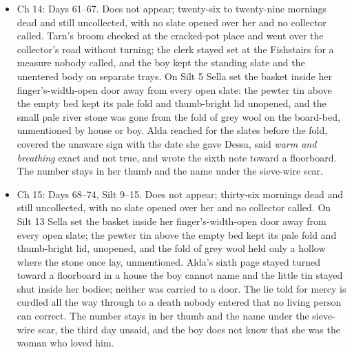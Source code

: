 \documentclass{design/chronicle}
\begin{document}
{\begin{itemize}[leftmargin=1.4em,itemsep=1pt,topsep=3pt,parsep=0pt]
\end{itemize}

\begin{itemize}[leftmargin=1.4em,itemsep=1pt,topsep=3pt,parsep=0pt]

\item Ch 14: Days 61–67. Does not appear; twenty-six to twenty-nine mornings dead and still uncollected, with no slate opened over her and no collector called. Tarn’s broom checked at the cracked-pot place and went over the collector’s road without turning; the clerk stayed set at the Fishstairs for a measure nobody called, and the boy kept the standing slate and the unentered body on separate trays. On Silt 5 Sella set the basket inside her finger’s-width-open door away from every open slate: the pewter tin above the empty bed kept its pale fold and thumb-bright lid unopened, and the small pale river stone was gone from the fold of grey wool on the board-bed, unmentioned by house or boy. Alda reached for the slates before the fold, covered the unaware sign with the date she gave Dessa, said \emph{warm and breathing} exact and not true, and wrote the sixth note toward a floorboard. The number stays in her thumb and the name under the sieve-wire scar.

\end{itemize}

\begin{itemize}[leftmargin=1.4em,itemsep=1pt,topsep=3pt,parsep=0pt]

\item Ch 15: Days 68–74, Silt 9–15. Does not appear; thirty-six mornings dead and still uncollected, with no slate opened over her and no collector called. On Silt 13 Sella set the basket inside her finger’s-width-open door away from every open slate; the pewter tin above the empty bed kept its pale fold and thumb-bright lid, unopened, and the fold of grey wool held only a hollow where the stone once lay, unmentioned. Alda’s sixth page stayed turned toward a floorboard in a house the boy cannot name and the little tin stayed shut inside her bodice; neither was carried to a door. The lie told for mercy is curdled all the way through to a death nobody entered that no living person can correct. The number stays in her thumb and the name under the sieve-wire scar, the third day unsaid, and the boy does not know that she was the woman who loved him.

\end{itemize}
}
\end{document}
